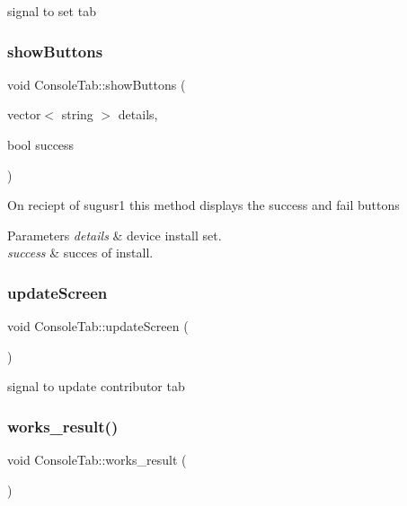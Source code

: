signal to set tab \mbox{\label{classConsoleTab_abda9ef659782544e72f0e4561c5583f0}} 
\subsubsection{\texorpdfstring{show\+Buttons}{showButtons}}
{\footnotesize\ttfamily void Console\+Tab\+::show\+Buttons (\begin{DoxyParamCaption}\item[{vector$<$ string $>$}]{details,  }\item[{bool}]{success }\end{DoxyParamCaption})\hspace{0.3cm}{\ttfamily [slot]}}

On reciept of sugusr1 this method displays the success and fail buttons 
\begin{DoxyParams}{Parameters}
{\em details} & device install set. \\
\hline
{\em success} & succes of install. \\
\hline
\end{DoxyParams}
\mbox{\label{classConsoleTab_a741773c43f4a548ffd154022429a3830}} 
\subsubsection{\texorpdfstring{update\+Screen}{updateScreen}}
{\footnotesize\ttfamily void Console\+Tab\+::update\+Screen (\begin{DoxyParamCaption}{ }\end{DoxyParamCaption})\hspace{0.3cm}{\ttfamily [signal]}}

signal to update contributor tab \mbox{\label{classConsoleTab_a866367073a3150527988f7cb841d5002}} 
\subsubsection{\texorpdfstring{works\+\_\+result()}{works\_result()}}
{\footnotesize\ttfamily void Console\+Tab\+::works\+\_\+result (\begin{DoxyParamCaption}{ }\end{DoxyParamCaption})}

